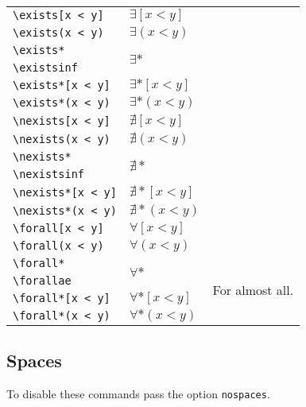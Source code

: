 \documentclass[leqno,11pt]{amsart}
\newcommand{\tab}{\hspace{1cm}}
\begin{document}
\begin{tabular}{l |  l | l}\toprule
	\verb=\exists[x < y]=		& \( \exists[x < y ] \) & \\[6pt]
	\verb=\exists(x < y)=		& \( \exists(x < y ) \) & \\ \midrule
	\verb=\exists*=		& \multirow{2}{*}{\( \exists* \)} & \\[6pt]
	\tab \verb=\existsinf=	&				  & \\[6pt]
	\verb=\exists*[x < y]=		& \( \exists*[x < y ] \) & \\[6pt]
	\verb=\exists*(x < y)=		& \( \exists*(x < y ) \) & \\ \midrule
	\verb=\nexists[x < y]=		& \( \nexists[x < y ] \) & \\[6pt]
	\verb=\nexists(x < y)=		& \( \nexists(x < y ) \) & \\ \midrule
	\verb=\nexists*=		& \multirow{2}{*}{\( \nexists* \)} & \\[6pt]
	\tab \verb=\nexistsinf=	&				  & \\[6pt]
	\verb=\nexists*[x < y]=		& \( \nexists*[x < y ] \) & \\[6pt]
	\verb=\nexists*(x < y)=		& \( \nexists*(x < y ) \) & \\ \midrule
	\verb=\forall[x < y]=		& \( \forall[x < y ] \) & \\[6pt]
	\tab \verb=\forall(x < y)=		& \( \forall(x < y ) \) & \\ \midrule
	\verb=\forall*=		& \multirow{2}{*}{\( \forall* \)} &\multirow{4}{*}{For almost all.} \\
	\tab \verb=\forallae=	&				  & \\[6pt]
	\verb=\forall*[x < y]=		& \( \forall*[x < y ] \) & \\[6pt]
	\verb=\forall*(x < y)=		& \( \forall*(x < y ) \) & \\ \midrule

	\bottomrule
\end{tabular}

\subsection{Spaces}
To disable these commands pass the option \verb=nospaces=.\\  
\end{document}
